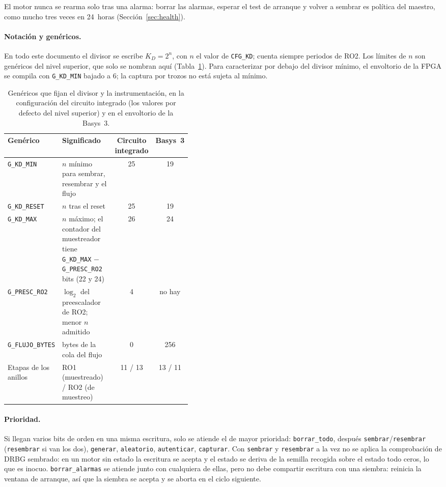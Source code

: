 El motor nunca se rearma solo tras una alarma: borrar las alarmas, esperar
el test de arranque y volver a sembrar es política del maestro, como mucho
tres veces en 24~horas (Sección~\ref{sec:health}).

\paragraph{Notación y genéricos.} En todo este documento el divisor se
escribe $K_D = 2^{n}$, con $n$ el valor de \texttt{CFG\_KD}; cuenta
siempre periodos de RO2. Los límites de $n$ son genéricos del nivel
superior, que solo se nombran aquí (Tabla~\ref{tab:app_generics}). Para
caracterizar por debajo del divisor mínimo, el envoltorio de la \ac{FPGA}
se compila con \texttt{G\_KD\_MIN} bajado a 6; la captura por trozos no
está sujeta al mínimo.

\begin{table}[htbp]
\centering\small
\caption{Genéricos que fijan el divisor y la instrumentación, en la
configuración del circuito integrado (los valores por defecto del nivel
superior) y en el envoltorio de la Basys~3.}
\label{tab:app_generics}
\begin{tabular}{@{}l>{\raggedright\arraybackslash}p{0.42\linewidth}cc@{}}
\toprule
Genérico & Significado & Circuito integrado & Basys~3 \\
\midrule
\texttt{G\_KD\_MIN} & $n$ mínimo para sembrar, resembrar y el flujo & 25 & 19 \\
\texttt{G\_KD\_RESET} & $n$ tras el reset & 25 & 19 \\
\texttt{G\_KD\_MAX} & $n$ máximo; el contador del muestreador tiene
  \texttt{G\_KD\_MAX} $-$ \texttt{G\_PRESC\_RO2} bits (22 y 24) & 26 & 24 \\
\texttt{G\_PRESC\_RO2} & $\log_2$ del preescalador de RO2; menor $n$ admitido & 4 & no hay \\
\texttt{G\_FLUJO\_BYTES} & bytes de la cola del flujo & 0 & 256 \\
Etapas de los anillos & RO1 (muestreado) / RO2 (de muestreo) & 11 / 13 & 13 / 11 \\
\bottomrule
\end{tabular}
\end{table}

\paragraph{Prioridad.} Si llegan varios bits de orden en una misma
escritura, solo se atiende el de mayor prioridad: \texttt{borrar\_todo},
después \texttt{sembrar}/\texttt{resembrar} (\texttt{resembrar} si van los
dos), \texttt{generar}, \texttt{aleatorio}, \texttt{autenticar},
\texttt{capturar}. Con \texttt{sembrar} y \texttt{resembrar} a la vez no
se aplica la comprobación de \ac{DRBG} sembrado: en un motor sin estado
la escritura se acepta y el estado se deriva de la semilla recogida
sobre el estado todo ceros, lo que es inocuo.
\texttt{borrar\_alarmas} se atiende junto con
cualquiera de ellas, pero no debe compartir escritura con una siembra:
reinicia la ventana de arranque, así que la siembra se acepta y se aborta
en el ciclo siguiente.

